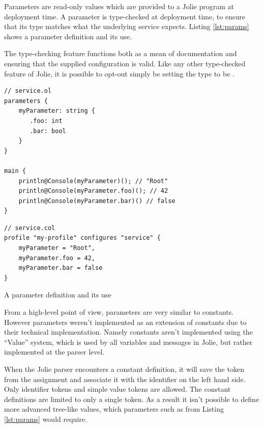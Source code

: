 Parameters are read-only values which are provided to a Jolie program at
deployment time. A parameter is type-checked at deployment time, to ensure that
its type matches what the underlying service expects. Listing \ref{lst:params}
shows a parameter definition and its use.

The type-checking feature functions both as a mean of documentation and
ensuring that the supplied configuration is valid. Like any other type-checked
feature of Jolie, it is possible to opt-out simply be setting the type to be
.

\begin{listing}[H]
\begin{multicols}{2}
\begin{verbatim}
// service.ol
parameters {
    myParameter: string {
       .foo: int
       .bar: bool
    }
}

main {
    println@Console(myParameter)(); // "Root"
    println@Console(myParameter.foo)(); // 42
    println@Console(myParameter.bar)() // false
}
\end{verbatim}

\columnbreak

\begin{verbatim}
// service.col
profile "my-profile" configures "service" {
    myParameter = "Root",
    myParameter.foo = 42,
    myParameter.bar = false
}
\end{verbatim}

\end{multicols}
\caption{A parameter definition and its use}
\label{lst:params}
\end{listing}

From a high-level point of view, parameters are very similar to constants.
However parameters weren't implemented as an extension of constants due to
their technical implementation. Namely constants aren't implemented using the
``Value'' system, which is used by all variables and messages in Jolie, but
rather implemented at the parser level.

When the Jolie parser encounters a constant definition, it will save the token
from the assignment and associate it with the identifier on the left hand side.
Only identifier tokens and simple value tokens are allowed. The constant
definitions are limited to only a single token. As a result it isn't possible
to define more advanced tree-like values, which parameters such as
 from Listing \ref{lst:params} would require.

